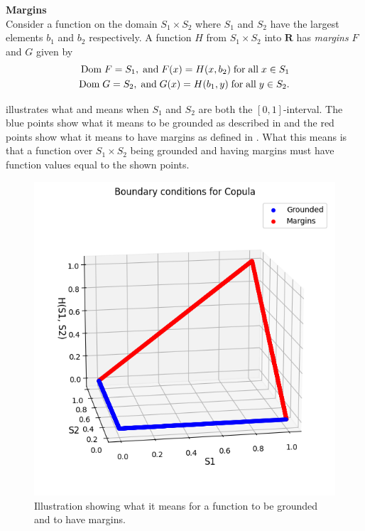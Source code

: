 \begin{definition}\label{def:margins}
    \textbf{Margins}\\
    Consider a function on the domain $S_1\times S_2$ where $S_1$ and $S_2$ have the largest elements $b_1$ and $b_2$ respectively. A function $H$ from $S_1\times S_2$ into $\mathbf{R}$ has \emph{margins} $F$ and $G$ given by
    \begin{align*}
        \mathrm{Dom \;} F = S_1, \;\mathrm{and }\; F(x) = H(x,b_2) \;\mathrm{for \;all\;} x \in S_1\\
        \mathrm{Dom \;} G = S_2, \;\mathrm{and }\; G(x) = H(b_1,y) \;\mathrm{for \;all\;} y \in S_2.
    \end{align*}
\end{definition}

 illustrates what  and  means when $S_1$ and $S_2$ are both the $[0,1]$-interval. The blue points show what it means to be grounded as described in  and the red points show what it means to have margins as defined in . What this means is that a function over $S_1\times S_2$ being grounded and having margins must have function values equal to the shown points. 

\begin{figure}
    \centering
    \includegraphics[width=0.5\linewidth]{3Theory/pictures/CopulaBoundaries.png}
    \caption{Illustration showing what it means for a function to be grounded and to have margins.}
    \label{fig:GroundedAndMargins}
\end{figure}

